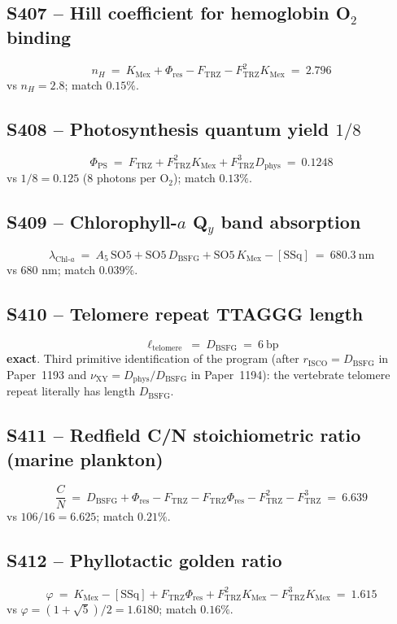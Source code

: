\documentclass[11pt]{article}
\newcommand{\Ftrz}{F_{\mathrm{TRZ}}}
\newcommand{\Phires}{\Phi_{\mathrm{res}}}
\newcommand{\KMex}{K_{\mathrm{Mex}}}
\newcommand{\Dphys}{D_{\mathrm{phys}}}
\newcommand{\Dbsfg}{D_{\mathrm{BSFG}}}
\newcommand{\SOfive}{\mathrm{SO5}}
\newcommand{\Afive}{A_{5}}
\newcommand{\SSq}{[\mathrm{SSq}]}
\begin{document}
\subsection{S407 -- Hill coefficient for hemoglobin O$_2$ binding}
\[
n_{H}\ =\ \KMex+\Phires-\Ftrz-\Ftrz^{2}\KMex\ =\ 2.796
\]
vs $n_{H}=2.8$; match $0.15\%$.

\subsection{S408 -- Photosynthesis quantum yield $1/8$}
\[
\Phi_{\text{PS}}\ =\ \Ftrz+\Ftrz^{2}\KMex+\Ftrz^{3}\Dphys\ =\ 0.1248
\]
vs $1/8=0.125$ (8 photons per O$_2$); match $0.13\%$.

\subsection{S409 -- Chlorophyll-$a$ Q$_y$ band absorption}
\[
\lambda_{\text{Chl-}a}\ =\ \Afive\,\SOfive+\SOfive\,\Dbsfg+\SOfive\,\KMex-\SSq\ =\ 680.3\ \text{nm}
\]
vs $680$ nm; match $0.039\%$.

\subsection{S410 -- Telomere repeat TTAGGG length}
\[
\ell_{\text{telomere}}\ =\ \Dbsfg\ =\ 6\ \text{bp}
\]
\textbf{exact}. Third primitive identification of the program (after
$r_{\text{ISCO}}=\Dbsfg$ in Paper~1193 and $\nu_{\text{XY}}=\Dphys/\Dbsfg$ in Paper~1194): the
vertebrate telomere repeat literally has length $\Dbsfg$.

\subsection{S411 -- Redfield C/N stoichiometric ratio (marine plankton)}
\[
\frac{C}{N}\ =\ \Dbsfg+\Phires-\Ftrz-\Ftrz\Phires-\Ftrz^{2}-\Ftrz^{3}\ =\ 6.639
\]
vs $106/16=6.625$; match $0.21\%$.

\subsection{S412 -- Phyllotactic golden ratio}
\[
\varphi\ =\ \KMex-\SSq+\Ftrz\Phires+\Ftrz^{2}\KMex-\Ftrz^{3}\KMex\ =\ 1.615
\]
vs $\varphi=(1+\sqrt{5})/2=1.6180$; match $0.16\%$.
\end{document}
